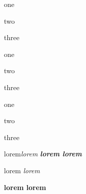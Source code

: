 


\label{0}


{\ttfamily 
\begin{myitemize}
\item{} one
\item{} two
\end{myitemize}

}
three
{\itshape 
\begin{myitemize}
\item{} one
\item{} two
\end{myitemize}

}
three

{\bfseries 
\begin{myitemize}
\item{} one
\item{} two
\end{myitemize}

}
three

lorem{\itshape  lorem {\bfseries  lorem {\ttfamily  lorem } }  } 

{\ttfamily  lorem {\itshape  lorem  }  }

{\bfseries  lorem {\ttfamily  lorem  }  }




